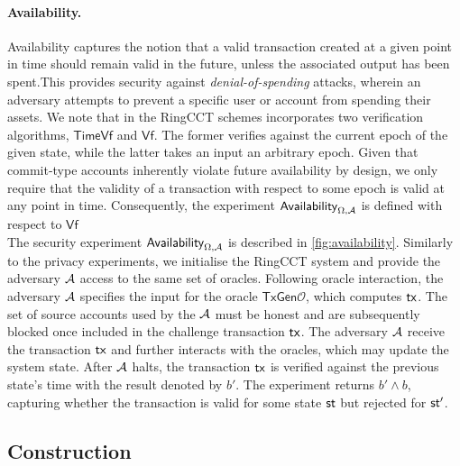 \paragraph*{Availability.} Availability captures the notion that a valid transaction created at a given point in time should remain valid in the future, unless the associated output has been spent.This provides security against \textit{denial-of-spending} attacks, wherein an adversary attempts to prevent a specific user or account from spending their assets.  We note that in the RingCCT schemes incorporates two verification algorithms, $\mathsf{TimeVf}$ and $\mathsf{Vf}$. The former verifies against the current epoch of the given state, while the latter takes an input an arbitrary epoch. Given that commit-type accounts inherently violate future availability by design, we only require that the validity of a transaction with respect to some epoch is valid at any point in time. Consequently, the experiment $\mathsf{Availability}_{\Omega,\mathcal{A}}$ is defined with respect to $\mathsf{Vf}$ \\
The security experiment $\mathsf{Availability}_{\Omega,\mathcal{A}}$ is described in \cref{fig:availability}. Similarly to the privacy experiments, we initialise the RingCCT system and provide the adversary $\mathcal{A}$ access to the same set of oracles. Following oracle interaction, the adversary $\mathcal{A}$ specifies the input for the oracle $\mathsf{TxGen}\mathcal{O}$, which computes $\mathsf{tx}$. The set of source accounts used by the $\mathcal{A}$ must be honest and are subsequently blocked once included in the challenge transaction $\mathsf{tx}$. The adversary $\mathcal{A}$ receive the transaction $\mathsf{tx}$ and further interacts with the oracles, which may update the system state. After $\mathcal{A}$ halts, the transaction $\mathsf{tx}$ is verified against the previous state's time with the result denoted by $b'$. The experiment returns $b' \land b$, capturing whether the transaction is valid for some state $\st$ but rejected for $\st'$. \\
\newpage

\subsection{Construction}

